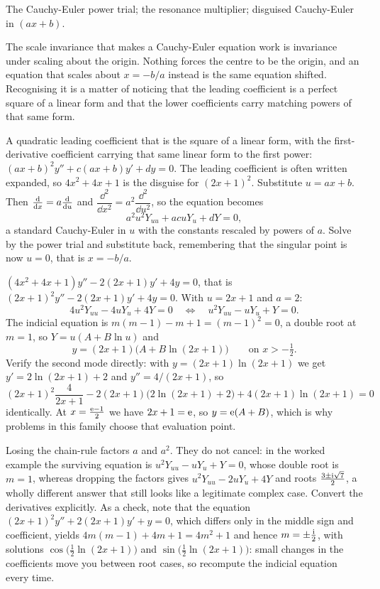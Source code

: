 \begin{seealsob}The Cauchy-Euler power trial; the resonance multiplier; disguised Cauchy-Euler in $(ax+b)$.\end{seealsob}

The scale invariance that makes a Cauchy-Euler equation work is invariance under scaling about the origin. Nothing forces the centre to be the origin, and an equation that scales about $x=-b/a$ instead is the same equation shifted. Recognising it is a matter of noticing that the leading coefficient is a perfect square of a linear form and that the lower coefficients carry matching powers of that same form.

\cue A quadratic leading coefficient that is the square of a linear form, with the first-derivative coefficient carrying that same linear form to the first power: $(ax+b)^{2}y''+c(ax+b)y'+dy=0$. The leading coefficient is often written expanded, so $4x^{2}+4x+1$ is the disguise for $(2x+1)^{2}$.
\method Substitute $u=ax+b$. Then $\frac{\mathrm{d}}{\mathrm{d}x}=a\frac{\mathrm{d}}{\mathrm{d}u}$ and $\dfrac{\dd^{2}}{\dd x^{2}}=a^{2}\dfrac{\dd^{2}}{\dd u^{2}}$, so the equation becomes
\[a^{2}u^{2}Y_{uu}+acuY_{u}+dY=0,\]
a standard Cauchy-Euler in $u$ with the constants rescaled by powers of $a$. Solve by the power trial and substitute back, remembering that the singular point is now $u=0$, that is $x=-b/a$.

\begin{worked}
$(4x^{2}+4x+1)y''-2(2x+1)y'+4y=0$, that is $(2x+1)^{2}y''-2(2x+1)y'+4y=0$. With $u=2x+1$ and $a=2$:
\[4u^{2}Y_{uu}-4uY_{u}+4Y=0\quad\Longleftrightarrow\quad u^{2}Y_{uu}-uY_{u}+Y=0.\]
The indicial equation is $m(m-1)-m+1=(m-1)^{2}=0$, a double root at $m=1$, so $Y=u(A+B\ln u)$ and
\[y=(2x+1)\bigl(A+B\ln(2x+1)\bigr)\qquad\text{on }x>-\tfrac12.\]
Verify the second mode directly: with $y=(2x+1)\ln(2x+1)$ we get $y'=2\ln(2x+1)+2$ and $y''=4/(2x+1)$, so
\[(2x+1)^{2}\frac{4}{2x+1}-2(2x+1)\bigl(2\ln(2x+1)+2\bigr)+4(2x+1)\ln(2x+1)=0\]
identically. At $x=\tfrac{\mathrm{e}-1}{2}$ we have $2x+1=\mathrm{e}$, so $y=\mathrm{e}(A+B)$, which is why problems in this family choose that evaluation point.
\end{worked}

\begin{trap}
Losing the chain-rule factors $a$ and $a^{2}$. They do not cancel: in the worked example the surviving equation is $u^{2}Y_{uu}-uY_{u}+Y=0$, whose double root is $m=1$, whereas dropping the factors gives $u^{2}Y_{uu}-2uY_{u}+4Y$ and roots $\tfrac{3\pm\mathrm{i}\sqrt{7}}{2}$, a wholly different answer that still looks like a legitimate complex case. Convert the derivatives explicitly. As a check, note that the equation $(2x+1)^{2}y''+2(2x+1)y'+y=0$, which differs only in the middle sign and coefficient, yields $4m(m-1)+4m+1=4m^{2}+1$ and hence $m=\pm\tfrac{\mathrm{i}}{2}$, with solutions $\cos\bigl(\tfrac12\ln(2x+1)\bigr)$ and $\sin\bigl(\tfrac12\ln(2x+1)\bigr)$: small changes in the coefficients move you between root cases, so recompute the indicial equation every time.
\end{trap}

